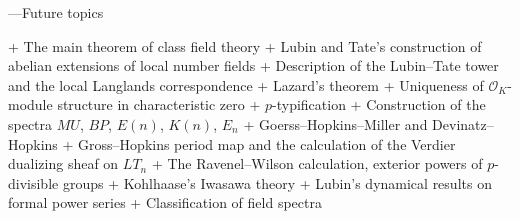 \documentclass[12pt]{book}
\renewcommand{\O}{\mathcal O}
\newcommand{\<}{\langle}
\renewcommand{\>}{\rangle}
\numberwithin{equation}{section}
\theoremstyle{plain}
\theoremstyle{definition}
\theoremstyle{remark}
\begin{document}
---Future topics

+ The main theorem of class field theory
+ Lubin and Tate's construction of abelian extensions of local number fields
+ Description of the Lubin--Tate tower and the local Langlands correspondence
+ Lazard's theorem
+ Uniqueness of $\O_K$-module structure in characteristic zero
+ $p$-typification
+ Construction of the spectra $MU$, $BP$, $E(n)$, $K(n)$, $E_n$
+ Goerss--Hopkins--Miller and Devinatz--Hopkins
+ Gross--Hopkins period map and the calculation of the Verdier dualizing sheaf on $LT_n$
+ The Ravenel--Wilson calculation, exterior powers of $p$-divisible groups
+ Kohlhaase's Iwasawa theory
+ Lubin's dynamical results on formal power series
+ Classification of field spectra





\newpage
\end{document}
